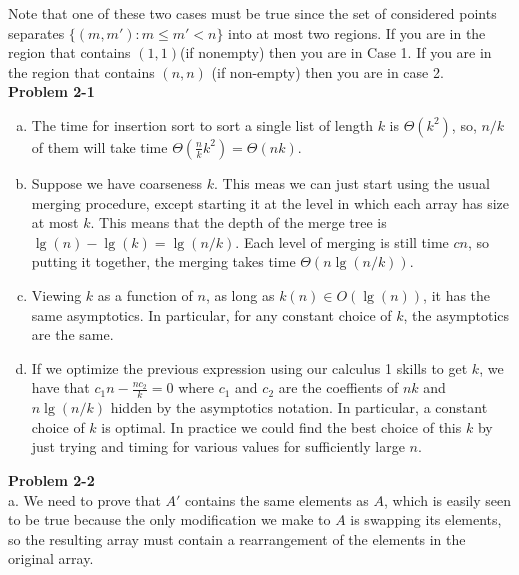 \documentclass{article}
\begin{document}
Note that one of these two cases must be true since the set of considered points separates $\{(m,m'): m\le m'<n\}$ into at most two regions. If you are in the region that contains $(1,1)$(if nonempty) then you are in Case 1. If you are in the region that contains $(n,n)$ (if non-empty) then you are in case 2. \\

\noindent\textbf{Problem 2-1} \\

\begin{enumerate}[a)]
\item
The time for insertion sort to sort a single list of length $k$ is $\Theta(k^2)$, so, $n/k$ of them will take time $\Theta(\frac{n}{k}k^2) = \Theta(nk)$.

\item
Suppose we have coarseness $k$. This meas we can just start using the usual merging procedure, except starting it at the level in which each array has size at most $k$. This means that the depth of the merge tree is $\lg(n) - \lg(k) = \lg(n/k)$. Each level of merging is still time $cn$, so putting it together, the merging takes time $\Theta(n\lg(n/k))$.


\item
Viewing $k$ as a function of $n$, as long as $k(n)\in O(\lg(n))$, it has the same asymptotics. In particular, for any constant choice of $k$, the asymptotics are the same.

\item
If we optimize the previous expression using our calculus 1 skills to get $k$, we have that $c_1n- \frac{nc_2}{k} = 0$ where $c_1$ and $c_2$ are the coeffients of $nk$ and $n\lg(n/k)$ hidden by the asymptotics notation. In particular, a constant choice of $k$ is optimal. In practice we could find the best choice of this $k$ by just trying and timing  for various values for sufficiently large $n$.

\end{enumerate}

\noindent\textbf{Problem 2-2}\\

a. We need to prove that $A'$ contains the same elements as $A$, which is easily seen to be true because the only modification we make to $A$ is swapping its elements, so the resulting array must contain a rearrangement of the elements in the original array. \\
\end{document}
